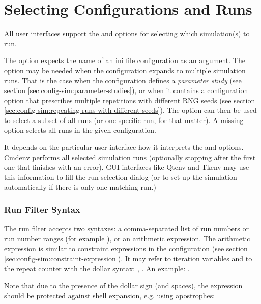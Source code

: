 

\section{Selecting Configurations and Runs}
\label{sec:run-sim:selecting-configuration-and-runs}

All user interfaces support the  and 
options for selecting which simulation(s) to run. 

The  option expects the name of an ini file configuration
as an argument. The  option may be needed when the configuration
expands to multiple simulation runs. That is the case when the
configuration defines a \textit{parameter study} (see section
\ref{sec:config-sim:parameter-studies}), or when it contains 
a  configuration option that prescribes 
multiple repetitions with different RNG seeds (see section 
\ref{sec:config-sim:repeating-runs-with-different-seeds}).
The  option can then be used to select a subset of all runs (or one
specific run, for that matter). A missing  option selects all runs in
the given configuration.

It depends on the particular user interface how it interprets the 
 and  options. Cmdenv performs all selected simulation runs
(optionally stopping after the first one that finishes with an error).
GUI interfaces like Qtenv and Tkenv may use this information to fill the
run selection dialog (or to set up the simulation automatically if there is
only one matching run.)


\subsubsection{Run Filter Syntax}

The run filter accepts two syntaxes: a comma-separated list of run numbers or
run number ranges (for example ), or an arithmetic expression.
The arithmetic expression is similar to constraint expressions in the
configuration (see section \ref{sec:config-sim:constraint-expression}).
It may refer to iteration variables and to the repeat counter with the dollar
syntax: , . An example: . 

Note that due to the presence of the dollar sign (and spaces), the expression
should be protected against shell expansion, e.g. using apostrophes:

